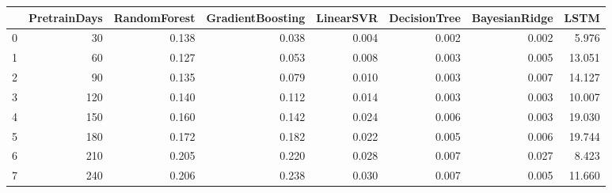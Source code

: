 \begin{tabular}{lrrrrrrr}
\toprule
{} &  PretrainDays &  RandomForest &  GradientBoosting &  LinearSVR &  DecisionTree &  BayesianRidge &   LSTM \\
\midrule
0 &            30 &         0.138 &             0.038 &      0.004 &         0.002 &          0.002 &  5.976 \\
1 &            60 &         0.127 &             0.053 &      0.008 &         0.003 &          0.005 & 13.051 \\
2 &            90 &         0.135 &             0.079 &      0.010 &         0.003 &          0.007 & 14.127 \\
3 &           120 &         0.140 &             0.112 &      0.014 &         0.003 &          0.003 & 10.007 \\
4 &           150 &         0.160 &             0.142 &      0.024 &         0.006 &          0.003 & 19.030 \\
5 &           180 &         0.172 &             0.182 &      0.022 &         0.005 &          0.006 & 19.744 \\
6 &           210 &         0.205 &             0.220 &      0.028 &         0.007 &          0.027 &  8.423 \\
7 &           240 &         0.206 &             0.238 &      0.030 &         0.007 &          0.005 & 11.660 \\
\bottomrule
\end{tabular}
